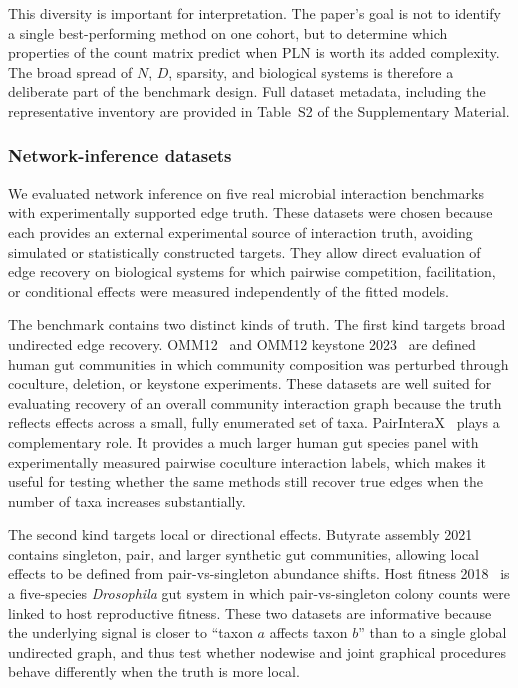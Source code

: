\documentclass[USenglish]{article}
\theoremstyle{dgthm}
\begin{document}
This diversity is important for interpretation.
The paper's goal is not to identify a single best-performing method on one cohort, but to determine which properties of the count matrix predict when PLN is worth its added complexity.
The broad spread of $N$, $D$, sparsity, and biological systems is therefore a deliberate part of the benchmark design.
Full dataset metadata, including the representative inventory are provided in Table~S2 of the Supplementary Material.


\subsubsection{Network-inference datasets}
\label{subsubsec:network-inference-datasets}
We evaluated network inference on five real microbial interaction benchmarks with experimentally supported edge truth.
These datasets were chosen because each provides an external experimental source of interaction truth, avoiding simulated or statistically constructed targets.
They allow direct evaluation of edge recovery on biological systems for which pairwise competition, facilitation, or conditional effects were measured independently of the fitted models.

The benchmark contains two distinct kinds of truth.
The first kind targets broad undirected edge recovery.
OMM12~\citep{Weiss2022OMM12} and OMM12 keystone 2023~\citep{Weiss2023Keystone} are defined human gut communities in which community composition was perturbed through coculture, deletion, or keystone experiments.
These datasets are well suited for evaluating recovery of an overall community interaction graph because the truth reflects effects across a small, fully enumerated set of taxa.
PairInteraX~\citep{Zhu2025PairInteraX} plays a complementary role.
It provides a much larger human gut species panel with experimentally measured pairwise coculture interaction labels, which makes it useful for testing whether the same methods still recover true edges when the number of taxa increases substantially.

The second kind targets local or directional effects.
Butyrate assembly 2021~\citep{Clark2021Butyrate} contains singleton, pair, and larger synthetic gut communities, allowing local effects to be defined from pair-vs-singleton abundance shifts.
Host fitness 2018~\citep{Gould2018HostFitness} is a five-species \textit{Drosophila} gut system in which pair-vs-singleton colony counts were linked to host reproductive fitness.
These two datasets are informative because the underlying signal is closer to ``taxon $a$ affects taxon $b$'' than to a single global undirected graph, and thus test whether nodewise and joint graphical procedures behave differently when the truth is more local.
\end{document}
